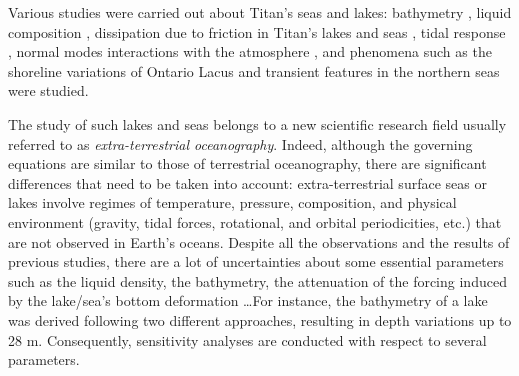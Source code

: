 Various studies were carried out about Titan's seas and lakes: bathymetry \citep[e.g.][]{hayes2010bathymetry, ventura2012electromagnetic, mastrogiuseppe2014bathymetry,mastrogiuseppe2018bathymetry, mastrogiuseppe2018cassini,lorenz2014radar, hayes2016lakes, hayes2017topographic}, liquid composition \citep[e.g.][]{brown2008identification, cordier2009estimate, glein2013geochemical, tan2013titan, tan2015titan, luspay2015experimental}, dissipation due to friction in Titan's lakes and seas \citep[e.g.][]{sagan1982tide, dermott1995tidal, sears1995tidal, lorenz2014radar}, tidal response \citep{tokano2010simulation, tokano2014numerical,vincent2016numerical,vincent2018numerical}, normal modes \citep{dermott1995tidal,tokano2010simulation,vincent2019normal} interactions with the atmosphere \citep{tokano2015wind, tokano2015sun}, and phenomena such as the shoreline variations of Ontario Lacus \citep{turtle2011shoreline,hayes2011transient} and transient features in the northern seas \citep{hofgartner2014transient, hofgartner2016titan} were studied. 

 The study of such lakes and seas belongs to a new scientific research field usually referred to as \textit{extra-terrestrial oceanography}. Indeed, although the governing equations are similar to those of terrestrial oceanography, there are significant differences that need to be taken into account: extra-terrestrial surface seas or lakes involve regimes of temperature, pressure, composition, and physical environment (gravity, tidal forces, rotational, and orbital periodicities, etc.) that are not observed in Earth's oceans. Despite all the observations and the results of previous studies, there are a lot of uncertainties about some essential parameters such as the liquid density, the bathymetry, the attenuation of the forcing induced by the lake/sea's bottom deformation \dots For instance, the bathymetry of a lake was derived following two different approaches, resulting in depth variations up to 28 m. Consequently, sensitivity analyses are conducted with respect to several parameters.
 
